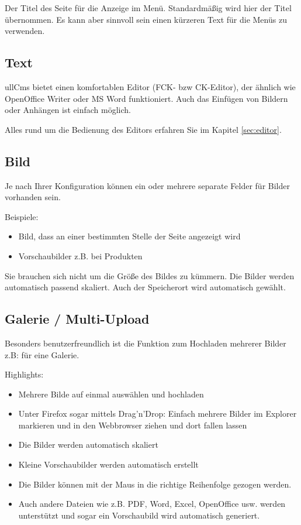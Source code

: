 \documentclass[article, a4paper, oneside, 11pt]{memoir}
\begin{document}
Der Titel des Seite für die Anzeige im Menü. Standardmäßig wird hier der Titel übernommen. Es kann aber sinnvoll sein einen kürzeren Text für die Menüs zu verwenden.

\subsection{Text}

ullCms bietet einen komfortablen
Editor (FCK- bzw CK-Editor), der ähnlich wie OpenOffice Writer oder MS Word funktioniert.
Auch das Einfügen von Bildern oder Anhängen ist einfach möglich. 

Alles rund um die Bedienung des Editors erfahren Sie im Kapitel \vref{sec:editor}.

\subsection{Bild}

Je nach Ihrer Konfiguration können ein oder mehrere separate Felder für Bilder vorhanden sein.

Beispiele:

\begin{itemize}
\item Bild, dass an einer bestimmten Stelle der Seite angezeigt wird
\item Vorschaubilder z.B. bei Produkten
\end{itemize}

Sie brauchen sich nicht um die Größe des Bildes zu kümmern. Die Bilder werden automatisch passend skaliert.
Auch der Speicherort wird automatisch gewählt.

\subsection{Galerie / Multi-Upload}
\label{sec:gallery}

Besonders benutzerfreundlich ist die Funktion zum Hochladen mehrerer Bilder z.B: für eine Galerie.

Highlights:
\begin{itemize}
\item Mehrere Bilde auf einmal auswählen und hochladen
\item Unter Firefox sogar mittels Drag'n'Drop: Einfach mehrere Bilder im Explorer markieren und in den Webbrowser ziehen und dort fallen lassen
\item Die Bilder werden automatisch skaliert
\item Kleine Vorschaubilder werden automatisch erstellt
\item Die Bilder können mit der Maus in die richtige Reihenfolge gezogen werden.
\item Auch andere Dateien wie z.B. PDF, Word, Excel, OpenOffice usw. werden unterstützt und sogar ein Vorschaubild wird automatisch generiert.
\end{itemize}
\end{document}
